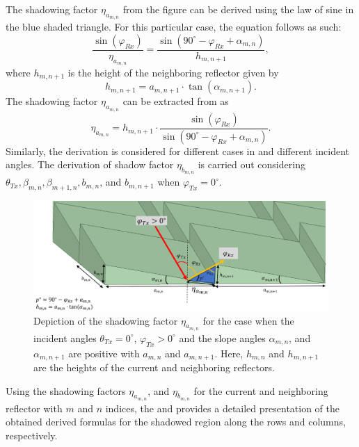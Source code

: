 The shadowing factor $\eta_{a_{m,n}}$ from the figure can be derived using the law of sine in the blue shaded triangle. For this particular case, the equation follows as such:
\begin{equation} \label{eq:shadowfactor}
	\frac{\sin(\varphi_{Rx})}{\eta_{a_{m,n}}}=\frac{\sin(90^\circ-\varphi_{Rx}+\alpha_{m,n})}{h_{m,n+1}},
\end{equation}
where $h_{m,n+1}$ is the height of the neighboring reflector given by
\begin{equation}
	h_{m,n+1}= a_{m,n+1} \cdot \tan(\alpha_{m,n+1}).
\end{equation}
The shadowing factor $\eta_{a_{m,n}}$ can be extracted from  as
\begin{equation}
	\eta_{a_{m,n}}=h_{m,n+1} \cdot \frac{\sin(\varphi_{Rx})}{\sin(90^\circ-\varphi_{Rx}+\alpha_{m,n})}.
\end{equation}
Similarly, the derivation is considered for different cases in  and different incident angles. The derivation of shadow factor $\eta_{b_{m,n}}$ is carried out considering $\theta_{Tx}, \beta_{m,n}, \beta_{m+1,n}, b_{m,n}$, and $b_{m,n+1}$ when $\varphi_{Tx}=0^\circ$. 
\begin{figure}[H]
	\centering
	\includegraphics[width=1\linewidth]{images/Section 3 Images/shadow_derivation}
	\caption{Depiction of the shadowing factor $\eta_{a_{m,n}}$ for the case when the incident angles $\theta_{Tx}=\num{0}^\circ$,  $\varphi_{Tx}>\num{0}^\circ$ and the slope angles $\alpha_{m,n}$, and $\alpha_{m,n+1}$ are positive with $a_{m,n}$ and $a_{m,n+1}$. Here, $h_{m,n}$ and $h_{m,n+1}$ are the heights of the current and neighboring reflectors. }
	\label{fig:shadow_derivation}
\end{figure}
Using the shadowing factors $\eta_{a_{m,n}}$, and $\eta_{b_{m,n}}$ for the current and neighboring reflector with $m$ and $n$ indices, the  and  provides a detailed presentation of the obtained derived formulas for the shadowed region along the rows and columns, respectively.

